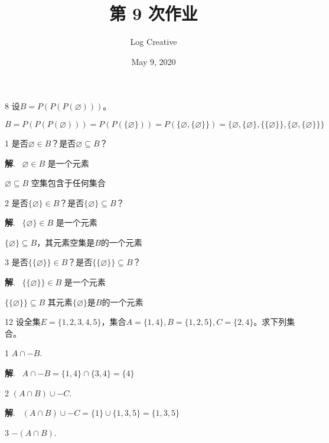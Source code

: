 \documentclass[12pt]{article}
\title{第 9 次作业}
\author{Log Creative}
\date{May 9, 2020}
\newenvironment{firstlayer}%
{\begin{list}{}{\renewcommand{\makelabel}[1]{\textbf{##1}.\hfil}
}}
{\end{list}}
\newenvironment{secondlayer}%
{\begin{list}{}{\renewcommand{\makelabel}[1]{(##1)\hfil}
}}
{\end{list}}
\providecommand{\sol}{\textbf{解}.~}
\begin{document}
\begin{CJK}{UTF8}{gbsn}

\maketitle

\begin{firstlayer}

\item[8] 设$B=P(P(P(\varnothing)))$。

$B=P(P(P(\varnothing)))=P(P(\{\varnothing\}))=P(\{ \varnothing,\{\varnothing \} \})=\{ \varnothing,\{ \varnothing \},\{ \{ \varnothing \} \},\{ \varnothing,\{ \varnothing \} \} \}$

\begin{secondlayer}
\item[1] 是否$\varnothing\in B$？是否$\varnothing\subseteq B$？

\sol
$\varnothing\in B$ 是一个元素

$\varnothing \subseteq B$ 空集包含于任何集合

\item[2] 是否$\{ \varnothing \}\in B$？是否$\{ \varnothing \}\subseteq B$？

\sol
$\{\varnothing\}\in B$ 是一个元素

$\{ \varnothing \}\subseteq B$，其元素空集是$B$的一个元素

\item[3] 是否$\{ \{ \varnothing \} \}\in B$？是否$\{ \{ \varnothing \} \}\subseteq B$？

\sol
$\{ \{ \varnothing \} \}\in B$ 是一个元素

$\{ \{ \varnothing \} \}\subseteq B$ 其元素$\{ \varnothing \}$是$B$的一个元素

\end{secondlayer}


\item[12] 设全集$E=\{1,2,3,4,5\}$，集合$A=\{1,4\},B=\{1,2,5\},C=\{2,4\}$。求下列集合。

\begin{secondlayer}
\item[1]$A\cap -B$.

\sol
$A\cap -B=\{1,4\}\cap\{3,4\}=\{4\}$

\item[2]$(A\cap B)\cup -C$.

\sol
$(A\cap B)\cup -C=\{1\}\cup\{1,3,5\}=\{1,3,5\}$

\item[3]$-(A\cap B)$.


\end{secondlayer}
\end{firstlayer}
\end{CJK}
\end{document}
